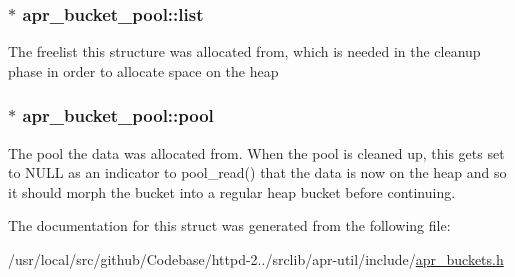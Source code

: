 \subsubsection[{\texorpdfstring{list}{list}}]{$\ast$ apr\+\_\+bucket\+\_\+pool\+::list}\hypertarget{structapr__bucket__pool_a651aa0c18658342daf72ff86680bfaca}{}\label{structapr__bucket__pool_a651aa0c18658342daf72ff86680bfaca}
The freelist this structure was allocated from, which is needed in the cleanup phase in order to allocate space on the heap 
\subsubsection[{\texorpdfstring{pool}{pool}}]{$\ast$ apr\+\_\+bucket\+\_\+pool\+::pool}\hypertarget{structapr__bucket__pool_af55591a1e7f3b097e7c271683bc80968}{}\label{structapr__bucket__pool_af55591a1e7f3b097e7c271683bc80968}
The pool the data was allocated from. When the pool is cleaned up, this gets set to N\+U\+LL as an indicator to pool\+\_\+read() that the data is now on the heap and so it should morph the bucket into a regular heap bucket before continuing. 

The documentation for this struct was generated from the following file\+:\begin{DoxyCompactItemize}
\item 
/usr/local/src/github/\+Codebase/httpd-\/2../srclib/apr-\/util/include/\hyperlink{apr__buckets_8h}{apr\+\_\+buckets.\+h}\end{DoxyCompactItemize}
